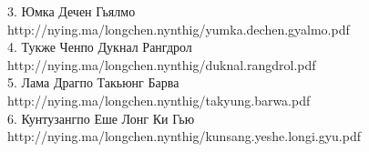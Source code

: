 3. Юмка Дечен Гьялмо\\
http://nying.ma/longchen.nynthig/yumka.dechen.gyalmo.pdf\\

4. Тукже Ченпо Дукнал Рангдрол\\
http://nying.ma/longchen.nynthig/duknal.rangdrol.pdf\\

5. Лама Драгпо Такьюнг Барва\\
http://nying.ma/longchen.nynthig/takyung.barwa.pdf\\

6. Кунтузангпо Еше Лонг Ки Гью\\
http://nying.ma/longchen.nynthig/kunsang.yeshe.longi.gyu.pdf\\
